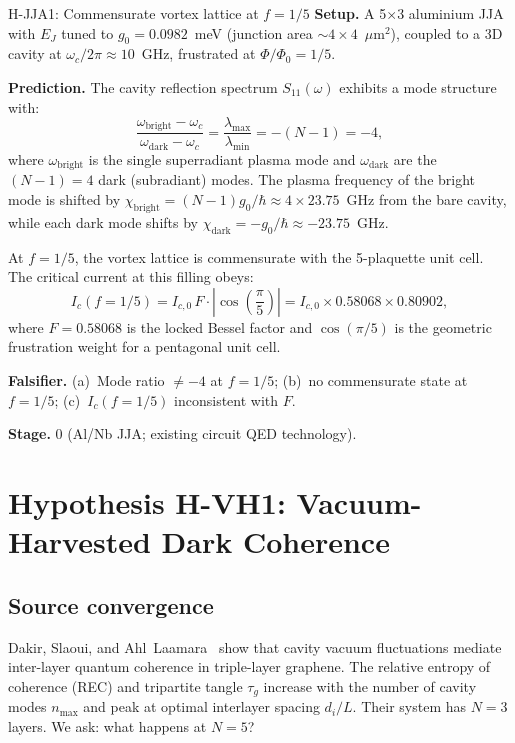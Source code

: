\documentclass[11pt,letterpaper]{article}
\newcommand{\gzero}{g_0}
\newcommand{\Flock}{F}
\begin{document}
\begin{hypothesis}{H-JJA1: Commensurate vortex lattice at $f = 1/5$}
\textbf{Setup.}  A 5$\times$3 aluminium JJA with $E_J$ tuned to $\gzero = 0.0982$~meV (junction area $\sim 4 \times 4$~$\mu$m$^2$), coupled to a 3D cavity at $\omega_c/2\pi \approx 10$~GHz, frustrated at $\Phi/\Phi_0 = 1/5$.

\textbf{Prediction.}  The cavity reflection spectrum $S_{11}(\omega)$ exhibits a mode structure with:
\begin{equation}\label{eq:jja1_split}
  \frac{\omega_{\mathrm{bright}} - \omega_c}{\omega_{\mathrm{dark}} - \omega_c}
  = \frac{\lambda_{\max}}{\lambda_{\min}}
  = -(N{-}1) = -4,
\end{equation}
where $\omega_{\mathrm{bright}}$ is the single superradiant plasma mode and $\omega_{\mathrm{dark}}$ are the $(N{-}1) = 4$ dark (subradiant) modes.
The plasma frequency of the bright mode is shifted by $\chi_{\mathrm{bright}} = (N{-}1)\gzero/\hbar \approx 4 \times 23.75$~GHz from the bare cavity, while each dark mode shifts by $\chi_{\mathrm{dark}} = -\gzero/\hbar \approx -23.75$~GHz.

At $f = 1/5$, the vortex lattice is commensurate with the 5-plaquette unit cell.  The critical current at this filling obeys:
\begin{equation}
  I_c(f{=}1/5) = I_{c,0}\,\Flock \cdot \left|\cos\!\left(\frac{\pi}{5}\right)\right| = I_{c,0} \times 0.58068 \times 0.80902,
\end{equation}
where $\Flock = 0.58068$ is the locked Bessel factor and $\cos(\pi/5)$ is the geometric frustration weight for a pentagonal unit cell.

\textbf{Falsifier.}  (a)~Mode ratio $\neq -4$ at $f = 1/5$; (b)~no commensurate state at $f = 1/5$; (c)~$I_c(f{=}1/5)$ inconsistent with $\Flock$.

\textbf{Stage.}  0 (Al/Nb JJA; existing circuit QED technology).
\end{hypothesis}


\section{Hypothesis H-VH1: Vacuum-Harvested Dark Coherence}\label{sec:hvh1}

\subsection{Source convergence}
Dakir, Slaoui, and Ahl~Laamara~\cite{Dakir2026} show that cavity vacuum fluctuations mediate inter-layer quantum coherence in triple-layer graphene.  The relative entropy of coherence (REC) and tripartite tangle $\tau_g$ increase with the number of cavity modes $n_{\max}$ and peak at optimal interlayer spacing $d_i/L$.
Their system has $N = 3$ layers.  We ask: what happens at $N = 5$?
\end{document}
